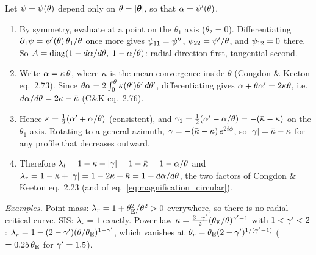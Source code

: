 \begin{derivation}[The axisymmetric case: $\lambda_t = 1 - \alpha/\theta$, $\lambda_r = 1 - d\alpha/d\theta$]
Let $\psi = \psi(\theta)$ depend only on $\theta = |\boldsymbol{\theta}|$, so that $\alpha = \psi'(\theta)$.
\begin{enumerate}
    \item By symmetry, evaluate at a point on the $\theta_1$ axis
          ($\theta_2 = 0$). Differentiating
          $\partial_1\psi = \psi'(\theta)\,\theta_1/\theta$ once more gives
          $\psi_{11} = \psi''$, $\psi_{22} = \psi'/\theta$, and
          $\psi_{12} = 0$ there. So
          $\mathcal{A} = \operatorname{diag}(1 - d\alpha/d\theta,\; 1 - \alpha/\theta)$:
          radial direction first, tangential second.
    \item Write $\alpha = \bar{\kappa}\,\theta$, where $\bar{\kappa}$ is the mean
          convergence inside $\theta$ (Congdon \& Keeton eq.~2.73). Since
          $\theta\alpha = 2\int_0^\theta\kappa(\theta')\theta'\,d\theta'$,
          differentiating gives $\alpha + \theta\alpha' = 2\kappa\theta$, i.e.\
          $d\alpha/d\theta = 2\kappa - \bar{\kappa}$ (C\&K eq.~2.76).
    \item Hence $\kappa = \tfrac12(\alpha' + \alpha/\theta)$ (consistent),
          and $\gamma_1 = \tfrac12(\alpha' - \alpha/\theta) = -(\bar{\kappa} - \kappa)$
          on the $\theta_1$ axis. Rotating to a general azimuth,
          $\gamma = -(\bar{\kappa} - \kappa)\,e^{2i\phi}$, so
          $|\gamma| = \bar{\kappa} - \kappa$ for any profile that
          decreases outward.
    \item Therefore
          $\lambda_t = 1 - \kappa - |\gamma| = 1 - \bar{\kappa} = 1 - \alpha/\theta$ and
          $\lambda_r = 1 - \kappa + |\gamma| = 1 - 2\kappa + \bar{\kappa} = 1 - d\alpha/d\theta$,
          the two factors of Congdon \& Keeton eq.~2.23 (and of
          eq.~\eqref{eq:magnification_circular}).
\end{enumerate}
\emph{Examples.} Point mass: $\lambda_r = 1 + \theta_{\mathrm{E}}^2/\theta^2 > 0$
everywhere, so there is no radial critical curve. SIS: $\lambda_r = 1$
exactly. Power law $\kappa = \frac{3-\gamma'}{2}(\theta_{\mathrm{E}}/\theta)^{\gamma'-1}$ with
$1 < \gamma' < 2$: $\lambda_r = 1 - (2-\gamma')(\theta/\theta_{\mathrm{E}})^{1-\gamma'}$, which vanishes at
$\theta_r = \theta_{\mathrm{E}}(2-\gamma')^{1/(\gamma'-1)}$ ($= 0.25\,\theta_{\mathrm{E}}$ for $\gamma' = 1.5$).
\end{derivation}
